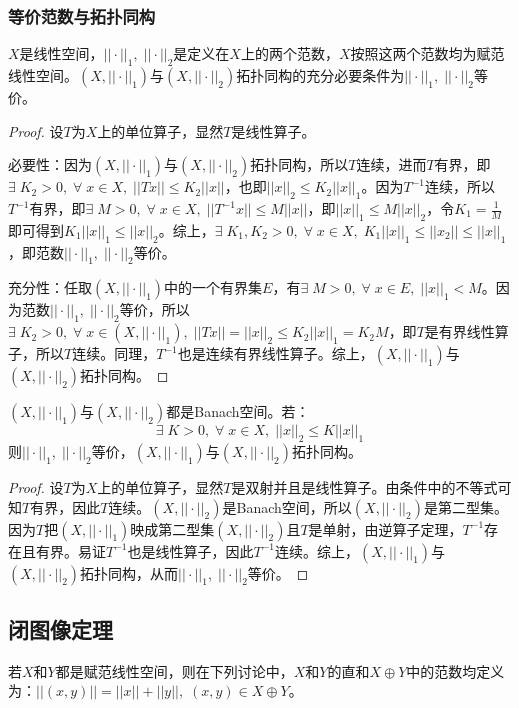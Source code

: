 \subsubsection{等价范数与拓扑同构}
\begin{theorem}
	$X$是线性空间，$||\cdot||_1,\;||\cdot||_2$是定义在$X$上的两个范数，$X$按照这两个范数均为赋范线性空间。$(X,||\cdot||_1)$与$(X,||\cdot||_2)$拓扑同构的充分必要条件为$||\cdot||_1,\;||\cdot||_2$等价。
\end{theorem}
\begin{proof}
	设$T$为$X$上的单位算子，显然$T$是线性算子。\par
	必要性：因为$(X,||\cdot||_1)$与$(X,||\cdot||_2)$拓扑同构，所以$T$连续，进而$T$有界，即$\exists\;K_2>0,\;\forall\;x\in X,\;||Tx||\leqslant K_2||x||$，也即$||x||_2\leqslant K_2||x||_1$。因为$T^{-1}$连续，所以$T^{-1}$有界，即$\exists\;M>0,\;\forall\;x\in X,\;||T^{-1}x||\leqslant M||x||$，即$||x||_1\leqslant M||x||_2$，令$K_1=\frac{1}{M}$即可得到$K_1||x||_1\leqslant||x||_2$。综上，$\exists\;K_1,K_2>0,\;\forall\;x\in X,\;K_1||x||_1\leqslant||x_2||\leqslant||x||_1$，即范数$||\cdot||_1,\;||\cdot||_2$等价。\par
	充分性：任取$(X,||\cdot||_1)$中的一个有界集$E$，有$\exists\;M>0,\;\forall\;x\in E,\;||x||_1<M$。因为范数$||\cdot||_1,\;||\cdot||_2$等价，所以$\exists\;K_2>0,\;\forall\;x\in(X,||\cdot||_1),\;||Tx||=||x||_2\leqslant K_2||x||_1=K_2M$，即$T$是有界线性算子，所以$T$连续。同理，$T^{-1}$也是连续有界线性算子。综上，$(X,||\cdot||_1)$与$(X,||\cdot||_2)$拓扑同构。
\end{proof}
\begin{corollary}
	$(X,||\cdot||_1)$与$(X,||\cdot||_2)$都是Banach空间。若：
	\begin{equation*}
		\exists\;K>0,\;\forall\;x\in X,\;||x||_2\leqslant K||x||_1
	\end{equation*}
	则$||\cdot||_1,\;||\cdot||_2$等价，$(X,||\cdot||_1)$与$(X,||\cdot||_2)$拓扑同构。
\end{corollary}
\begin{proof}
	设$T$为$X$上的单位算子，显然$T$是双射并且是线性算子。由条件中的不等式可知$T$有界，因此$T$连续。$(X,||\cdot||_2)$是Banach空间，所以$(X,||\cdot||_2)$是第二型集。因为$T$把$(X,||\cdot||_1)$映成第二型集$(X,||\cdot||_2)$且$T$是单射，由逆算子定理，$T^{-1}$存在且有界。易证$T^{-1}$也是线性算子，因此$T^{-1}$连续。综上，$(X,||\cdot||_1)$与$(X,||\cdot||_2)$拓扑同构，从而$||\cdot||_1,\;||\cdot||_2$等价。
\end{proof}

\subsection{闭图像定理}
若$X$和$Y$都是赋范线性空间，则在下列讨论中，$X$和$Y$的直和$X\oplus Y$中的范数均定义为：$||(x,y)||=||x||+||y||,\;(x,y)\in X\oplus Y$。
